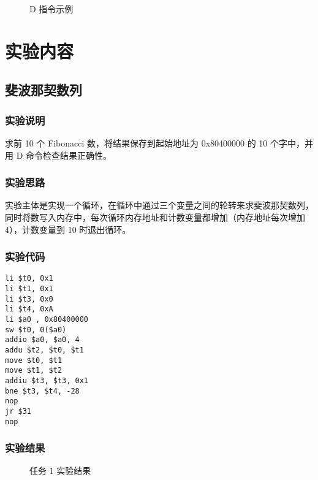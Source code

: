 \documentclass[a4paper]{article}
\begin{document}
        \begin{figure}[H]
            \centering
            \caption{D 指令示例}
        \end{figure}

    \newpage


\section{实验内容}

    \subsection{斐波那契数列}

        \subsubsection{实验说明}

            求前 10 个 Fibonacci 数，将结果保存到起始地址为 0x80400000 的 10 个字中，并用 D 命令检查结果正确性。
        
        \subsubsection{实验思路}

            实验主体是实现一个循环，在循环中通过三个变量之间的轮转来求斐波那契数列，同时将数写入内存中，每次循环内存地址和计数变量都增加（内存地址每次增加 4），计数变量到 10 时退出循环。
        
        \subsubsection{实验代码}

            \begin{lstlisting}
li $t0, 0x1
li $t1, 0x1
li $t3, 0x0
li $t4, 0xA
li $a0 , 0x80400000
sw $t0, 0($a0)
addio $a0, $a0, 4
addu $t2, $t0, $t1
move $t0, $t1
move $t1, $t2
addiu $t3, $t3, 0x1
bne $t3, $t4, -28
nop
jr $31
nop
            \end{lstlisting}

        \subsubsection{实验结果}

            \begin{figure}[H]
                \centering
                \caption{任务 1 实验结果}
            \end{figure}
\end{document}
